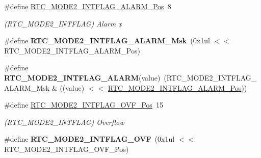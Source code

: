 \begin{DoxyCompactItemize}
\item 
\hypertarget{group___s_a_m_l21___r_t_c_gad350247d7a361c789394d8e1404aaf62}{}\#define \hyperlink{group___s_a_m_l21___r_t_c_gad350247d7a361c789394d8e1404aaf62}{R\+T\+C\+\_\+\+M\+O\+D\+E2\+\_\+\+I\+N\+T\+F\+L\+A\+G\+\_\+\+A\+L\+A\+R\+M\+\_\+\+Pos}~8\label{group___s_a_m_l21___r_t_c_gad350247d7a361c789394d8e1404aaf62}

\begin{DoxyCompactList}\small\item\em (R\+T\+C\+\_\+\+M\+O\+D\+E2\+\_\+\+I\+N\+T\+F\+L\+A\+G) Alarm x \end{DoxyCompactList}\item 
\hypertarget{group___s_a_m_l21___r_t_c_gaead1a568fea153291bfe3fd704d6e2b2}{}\#define {\bfseries R\+T\+C\+\_\+\+M\+O\+D\+E2\+\_\+\+I\+N\+T\+F\+L\+A\+G\+\_\+\+A\+L\+A\+R\+M\+\_\+\+Msk}~(0x1ul $<$$<$ R\+T\+C\+\_\+\+M\+O\+D\+E2\+\_\+\+I\+N\+T\+F\+L\+A\+G\+\_\+\+A\+L\+A\+R\+M\+\_\+\+Pos)\label{group___s_a_m_l21___r_t_c_gaead1a568fea153291bfe3fd704d6e2b2}

\item 
\hypertarget{group___s_a_m_l21___r_t_c_gae7331b1ad506c19d26ac9119210aa6b4}{}\#define {\bfseries R\+T\+C\+\_\+\+M\+O\+D\+E2\+\_\+\+I\+N\+T\+F\+L\+A\+G\+\_\+\+A\+L\+A\+R\+M}(value)~(R\+T\+C\+\_\+\+M\+O\+D\+E2\+\_\+\+I\+N\+T\+F\+L\+A\+G\+\_\+\+A\+L\+A\+R\+M\+\_\+\+Msk \& ((value) $<$$<$ \hyperlink{group___s_a_m_l21___r_t_c_gad350247d7a361c789394d8e1404aaf62}{R\+T\+C\+\_\+\+M\+O\+D\+E2\+\_\+\+I\+N\+T\+F\+L\+A\+G\+\_\+\+A\+L\+A\+R\+M\+\_\+\+Pos}))\label{group___s_a_m_l21___r_t_c_gae7331b1ad506c19d26ac9119210aa6b4}

\item 
\hypertarget{group___s_a_m_l21___r_t_c_ga367d99113c554f26245700b8f849b376}{}\#define \hyperlink{group___s_a_m_l21___r_t_c_ga367d99113c554f26245700b8f849b376}{R\+T\+C\+\_\+\+M\+O\+D\+E2\+\_\+\+I\+N\+T\+F\+L\+A\+G\+\_\+\+O\+V\+F\+\_\+\+Pos}~15\label{group___s_a_m_l21___r_t_c_ga367d99113c554f26245700b8f849b376}

\begin{DoxyCompactList}\small\item\em (R\+T\+C\+\_\+\+M\+O\+D\+E2\+\_\+\+I\+N\+T\+F\+L\+A\+G) Overflow \end{DoxyCompactList}\item 
\hypertarget{group___s_a_m_l21___r_t_c_ga8677f93de42f78149419dfba93581770}{}\#define {\bfseries R\+T\+C\+\_\+\+M\+O\+D\+E2\+\_\+\+I\+N\+T\+F\+L\+A\+G\+\_\+\+O\+V\+F}~(0x1ul $<$$<$ R\+T\+C\+\_\+\+M\+O\+D\+E2\+\_\+\+I\+N\+T\+F\+L\+A\+G\+\_\+\+O\+V\+F\+\_\+\+Pos)\label{group___s_a_m_l21___r_t_c_ga8677f93de42f78149419dfba93581770}


\end{DoxyCompactItemize}
